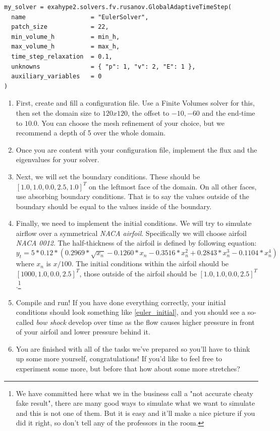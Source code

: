 \documentclass[12pt,letterpaper]{article}
\begin{document}
\begin{lstlisting}[style = Python]
my_solver = exahype2.solvers.fv.rusanov.GlobalAdaptiveTimeStep(
  name                  = "EulerSolver",
  patch_size            = 22,
  min_volume_h          = min_h,
  max_volume_h          = max_h,
  time_step_relaxation  = 0.1,
  unknowns              = { "p": 1, "v": 2, "E": 1 },
  auxiliary_variables   = 0
)
\end{lstlisting}

\begin{enumerate}
    \item
        First, create and fill a configuration file. Use a Finite Volumes solver for this, then set the domain size to $120x120$,
        the offset to $-10, -60$ and the end-time to $10.0$.
        You can choose the mesh refinement of your choice, but we recommend a depth of 5 over the whole domain.
    \item
        Once you are content with your configuration file, implement the flux and the eigenvalues for your solver.
    \item
        Next, we will set the boundary conditions. These should be $[1.0, 1.0, 0.0, 2.5, 1.0]^T$ on the leftmost face of the domain.
        On all other faces, use absorbing boundary conditions.
        That is to say the values outside of the boundary should be equal to the values inside of the boundary.
    \item
        Finally, we need to implement the initial conditions.
        We will try to simulate airflow over a symmetrical \textit{NACA airfoil}.
        Specifically we will choose airfoil \textit{NACA 0012}.
        The half-thickness of the airfoil is defined by following equation:
        \begin{equation}
            y_t = 5*0.12* ( 0.2969*\sqrt{x_n} - 0.1260*x_n - 0.3516*x_n^2 + 0.2843*x_n^3 - 0.1104*x_n^4 )
        \end{equation}
        where $x_n$ is $x/100$.
        The initial conditions within the airfoil should be $[1000, 1.0, 0.0, 2.5]^T$,
        those outside of the airfoil should be $[1.0, 1.0, 0.0, 2.5]^T$.\footnote{We have committed here what we in the business call a "not accurate cheaty fake result", there are many good ways to simulate what we want to simulate and this is not one of them. But it is easy and it'll make a nice picture if you did it right, so don't tell any of the professors in the room.}

    \item
        Compile and run! If you have done everything correctly, your initial conditions should look something like \ref{euler_initial},
        and you should see a so-called \textit{bow shock} develop over time as the flow causes higher pressure in front of your airfoil and lower pressure behind it.

    \item
        You are finished with all of the tasks we've prepared so you'll have to think up some more yourself, congratulations!
        If you'd like to feel free to experiment some more, but before that how about some more stretches?
\end{enumerate}
\end{document}
